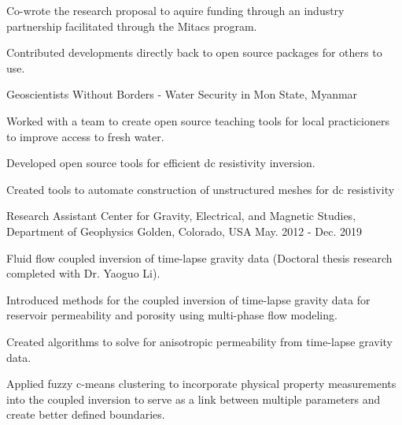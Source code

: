 \begin{cventries}
{\begin{cvitems}
        \item {Co-wrote the research proposal to aquire funding through an industry partnership facilitated through the Mitacs program.}
        \item {Contributed developments directly back to open source packages for others to use.}
        \vspace{10pt}
      \end{cvitems}
      \begin{cvparagraph}
      \vspace{7pt}
      Geoscientists Without Borders - Water Security in Mon State, Myanmar
      \vspace{7pt}
      \end{cvparagraph}
      \begin{cvitems}
        \item {Worked with a team to create open source teaching tools for local practicioners to improve access to fresh water.}
        \item {Developed open source tools for efficient dc resistivity inversion.}
        \item {Created tools to automate construction of unstructured meshes for dc resistivity}
        \vspace{10pt}
      \end{cvitems}}
  \cventry
    {Research Assistant} %
    {Center for Gravity, Electrical, and Magnetic Studies, Department of Geophysics} %
    {Golden, Colorado, USA} %
    {May. 2012 - Dec. 2019} %
    {\begin{cvparagraph}
      Fluid flow coupled inversion of time-lapse gravity data (Doctoral thesis research completed with Dr. Yaoguo Li).
      \vspace{7pt}
      \end{cvparagraph}
      \begin{cvitems} %
        \item {Introduced methods for the coupled inversion of time-lapse gravity data for reservoir permeability and porosity using multi-phase flow modeling.}
        \item {Created algorithms to solve for anisotropic permeability from time-lapse gravity data.}
        \item {Applied fuzzy c-means clustering to incorporate physical property measurements into the coupled inversion to serve as a link between multiple parameters and create better defined boundaries.}

\end{cvitems}}
\end{cventries}
